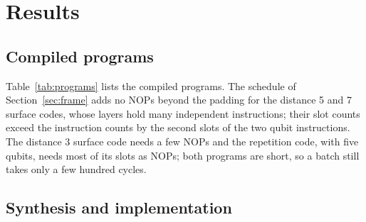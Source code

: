 \section{Results}\label{sec:results}

\subsection{Compiled programs}\label{sec:res-programs}

Table~\ref{tab:programs} lists the compiled programs. The schedule of Section~\ref{sec:frame} adds no NOPs beyond
the padding for the distance 5 and 7 surface codes, whose layers hold many independent instructions; their slot
counts exceed the instruction counts by the second slots of the two qubit instructions. The distance 3
surface code needs a few NOPs and the repetition code, with five qubits, needs most of its slots as NOPs; both
programs are short, so a batch still takes only a few hundred cycles.

\begin{table}[t]
\caption{Compiled programs. Instructions excludes the NOPs inserted by the schedule. Slots, the cycles per batch of
the frame stage, counts one slot per single qubit instruction, two per two qubit instruction and one per NOP.
Columns: qubits after renumbering, instructions, two qubit (2q) instructions, NOPs, slots, measurements,
outputs (detectors plus observables) and fold entries.}\label{tab:programs}

\end{table}

\subsection{Synthesis and implementation}\label{sec:res-impl}

